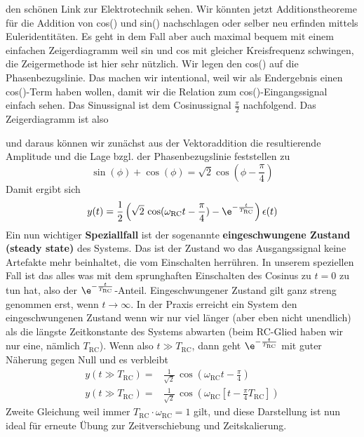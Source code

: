 \begin{Loesung}
\begin{itemize}
den schönen Link zur Elektrotechnik sehen.
%
Wir könnten jetzt Additionstheoreme für die Addition von cos() und sin() nachschlagen
oder selber neu erfinden mittels Euleridentitäten.
%
Es geht in dem Fall aber auch maximal bequem mit einem einfachen Zeigerdiagramm
weil sin und cos mit gleicher Kreisfrequenz schwingen, die Zeigermethode ist hier
sehr nützlich. Wir legen den cos() auf die Phasenbezugslinie.
Das machen wir intentional, weil wir als Endergebnis
einen cos()-Term haben wollen, damit wir die Relation zum cos()-Eingangssignal
einfach sehen. Das Sinussignal ist dem Cosinussignal $\frac{\pi}{2}$ nachfolgend.
Das Zeigerdiagramm ist also
\begin{center}
\end{center}
und daraus können wir zunächst aus der Vektoraddition die resultierende Amplitude und
die Lage bzgl. der Phasenbezugslinie feststellen zu
\begin{equation}
  \sin(\phi) + \cos(\phi) = \sqrt{2} \cos(\phi-\frac{\pi}{4})
\end{equation}
Damit ergibt sich
\begin{align}
  y(t) = \frac{1}{2}\left(
  \sqrt{2}\,\cos(\omega_\mathrm{RC} t - \frac{\pi}{4}) - \e^{-\frac{t}{T_\mathrm{RC}}}
  \right) \epsilon(t)
\end{align}
Ein nun wichtiger \textbf{Speziallfall} ist der sogenannte \textbf{eingeschwungene
Zustand (steady state)} des Systems.
%
Das ist der Zustand wo das Ausgangssignal keine Artefakte mehr beinhaltet, die
vom Einschalten herrühren.
In unserem speziellen Fall ist das alles was mit dem sprunghaften Einschalten
des Cosinus zu $t=0$ zu tun hat, also der
$\e^{-\frac{t}{T_\mathrm{RC}}}$-Anteil.
%
Eingeschwungener Zustand gilt ganz streng genommen erst, wenn $t\to\infty$.
In der Praxis erreicht ein System den eingeschwungenen Zustand wenn wir nur viel
länger (aber eben nicht unendlich) als die längste Zeitkonstante des Systems
abwarten (beim RC-Glied haben wir nur eine, nämlich $T_\mathrm{RC}$).
%
Wenn also $t \gg T_\mathrm{RC}$,
dann geht $\e^{-\frac{t}{T_\mathrm{RC}}}$ mit guter Näherung gegen Null
und es verbleibt
\begin{align}
  y(t \gg T_\mathrm{RC}) =& \frac{1}{\sqrt{2}} \,\cos(\omega_\mathrm{RC} t - \frac{\pi}{4})\\
  y(t \gg T_\mathrm{RC}) =& \frac{1}{\sqrt{2}} \,\cos(\omega_\mathrm{RC} \left[t - \frac{\pi}{4} T_\mathrm{RC}\right])
\end{align}
Zweite Gleichung weil immer $T_\mathrm{RC}\cdot \omega_\mathrm{RC} =1$ gilt, und diese Darstellung ist nun ideal für erneute Übung
zur Zeitverschiebung und Zeitskalierung.


\end{itemize}
\end{Loesung}
